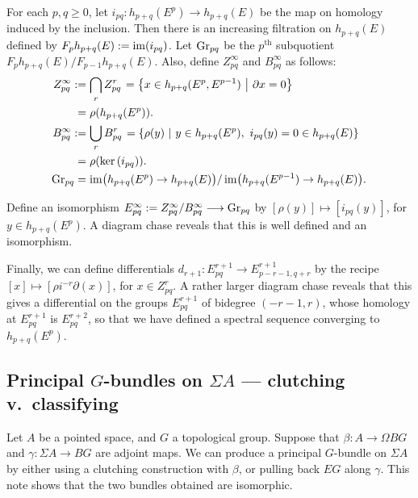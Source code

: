 \documentclass[11pt]{article}
\newcommand{\myheading}[1]
{{\noindent\Large #1}

}
\renewcommand{\myheading}[1]{\subsection{#1}}
\begin{document}
For each $p,q\geq0$, let $i_{pq}:h_{p+q}(E^p)\to h_{p+q}(E)$ be the map on homology induced by the inclusion. Then there is an increasing filtration on $h_{p+q}(E)$ defined by $F_{p}h_{p+q}(E):=\operatorname{im}(i_{pq})$. Let $\textup{Gr}_{pq}$ be the $p^\text{th}$ subquotient $F_{p}h_{p+q}(E)/F_{p-1}h_{p+q}(E)$. Also, define $Z^\infty_{pq}$ and $B^\infty_{pq}$ as follows:
\begin{alignat*}{2}
Z_{pq}^\infty:=&\left.\bigcap_r Z_{pq}^r\right.=\left\{x\in h_{p+q}(E^p,E^{p-1})\ \middle|\ \partial x=0\right\}\\
=&\left.\rho(h_{p+q}(E^p)).\right.\\
B_{pq}^\infty:=&\left.\bigcup_r B_{pq}^r\right.=\left\{\rho(y)\ \middle|\ y\in h_{p+q}(E^p),\ i_{pq}(y)=0\in h_{p+q}(E)\right\}\\
=&\left.\rho(\textup{ker}\, (i_{pq})).\right.\\
\textup{Gr}_{pq}=&\left.\operatorname{im}\bigl(h_{p+q}(E^p)\rightarrow h_{p+q}(E)\bigr)/\operatorname{im}\bigl(h_{p+q}(E^{p-1})\rightarrow h_{p+q}(E)\bigr).\right.
\end{alignat*}

Define an isomorphism $E^\infty_{pq}:=Z_{pq}^\infty/B_{pq}^\infty\longrightarrow \textup{Gr}_{pq}$
by $[\rho(y)]\mapsto[i_{pq}(y)]$, for $y\in h_{p+q}(E^p)$. A diagram chase reveals that this is well defined and an isomorphism.

Finally, we can define differentials $d_{r+1}:E^{r+1}_{pq}\to E^{r+1}_{p-r-1,q+r}$ by the recipe $[x]\mapsto [\rho i^{-r}\partial(x)]$, for $x\in Z_{pq}^{r}$. A rather larger diagram chase reveals that this gives a differential on the groups $E^{r+1}_{pq}$ of bidegree $(-r-1,r)$, whose homology at $E^{r+1}_{pq}$ is $E^{r+2}_{pq}$, so that we have defined a spectral sequence converging to $h_{p+q}(E^p)$.



\myheading{Principal \texorpdfstring{$G$}{G}-bundles on \texorpdfstring{$\Sigma A$}{SA} --- clutching v.\ classifying}
Let $A$ be a pointed space, and $G$ a topological group. Suppose that $\beta:A\to \Omega BG$ and $\gamma:\Sigma A\to BG$ are adjoint maps. We can produce a principal $G$-bundle on $\Sigma A$ by either using a clutching construction with $\beta$, or pulling back $EG$ along $\gamma$. This note shows that the two bundles obtained are isomorphic.
\end{document}
